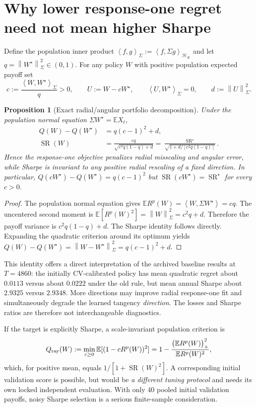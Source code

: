 \documentclass[11pt,a4paper]{article}
\newtheorem{proposition}[theorem]{Proposition}
\theoremstyle{remark}
\newcommand{\E}{\mathbb E}
\newcommand{\Hh}{\mathcal H_K}
\newcommand{\SR}{\operatorname{SR}}
\newcommand{\norm}[1]{\left\lVert#1\right\rVert}
\newcommand{\ip}[2]{\left\langle#1,#2\right\rangle}
\begin{document}
\section{Why lower response-one regret need not mean higher Sharpe}
Define the population inner product $\ip{f}{g}_\Sigma:=\ip{f}{\Sigma g}_{\Hh}$ and let $q=\norm{W^\star}_\Sigma^2\in(0,1)$. For any policy $W$ with positive population expected payoff set
\begin{equation}
 c:=\frac{\ip{W}{W^\star}_\Sigma}{q}>0,\qquad
 U:=W-cW^\star,\qquad
 \ip{U}{W^\star}_\Sigma=0,\qquad d:=\norm{U}_\Sigma^2.
\end{equation}

\begin{proposition}[Exact radial/angular portfolio decomposition]\label{prop:angle}
Under the population normal equation $\Sigma W^\star=\E X_t$,
\begin{align}
 Q(W)-Q(W^\star)&=q(c-1)^2+d,\label{eq:radialrisk}\\
 \SR(W)&=\frac{cq}{\sqrt{c^2q(1-q)+d}}
 =\frac{\SR^\star}{\sqrt{1+d/[c^2q(1-q)]}}.\label{eq:angularsharpe}
\end{align}
Hence the response-one objective penalizes radial misscaling and angular error, while Sharpe is invariant to any positive radial rescaling of a fixed direction. In particular, $Q(cW^\star)-Q(W^\star)=q(c-1)^2$ but $\SR(cW^\star)=\SR^\star$ for every $c>0$.
\end{proposition}
\begin{proof}
The population normal equation gives $\E R^p(W)=\ip{W}{\Sigma W^\star}=cq$. The uncentered second moment is $\E[R^p(W)^2]=\norm{W}_\Sigma^2=c^2q+d$. Therefore the payoff variance is $c^2q(1-q)+d$. The Sharpe identity follows directly. Expanding the quadratic criterion around its optimum yields $Q(W)-Q(W^\star)=\norm{W-W^\star}_\Sigma^2=q(c-1)^2+d$.
\end{proof}

This identity offers a direct interpretation of the archived baseline results at $T=4860$: the initially CV-calibrated policy has mean quadratic regret about $0.0113$ versus about $0.0222$ under the old rule, but mean annual Sharpe about $2.9325$ versus $2.9348$. More directions may improve radial response-one fit and simultaneously degrade the learned tangency \emph{direction}. The losses and Sharpe ratios are therefore not interchangeable diagnostics.

If the target is explicitly Sharpe, a scale-invariant population criterion is
\begin{equation}\label{eq:scale_free}
 Q_{\rm ray}(W):=\min_{c\ge0}\E[(1-cR^p(W))^2]
 =1-\frac{\bigl(\E R^p(W)\bigr)_+^2}{\E R^p(W)^2},
\end{equation}
which, for positive mean, equals $1/[1+\SR(W)^2]$. A corresponding initial validation score is possible, but would be \emph{a different tuning protocol} and needs its own locked independent evaluation. With only 40 pooled initial validation payoffs, noisy Sharpe selection is a serious finite-sample consideration.
\end{document}
